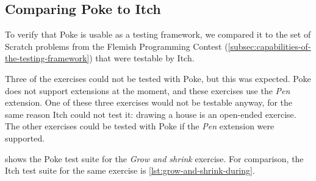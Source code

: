 \documentclass[../main]{subfiles}
\begin{document}
\subsection{Comparing Poke to Itch}\label{subsec:comparing-poke-to-itch}

To verify that Poke is usable as a testing framework, we compared it to the set of Scratch problems from the Flemish Programming Contest (\cref{subsec:capabilities-of-the-testing-framework}) that were testable by Itch.

Three of the exercises could not be tested with Poke, but this was expected.
Poke does not support extensions at the moment, and these exercises use the \textit{Pen} extension.
One of these three exercises would not be testable anyway, for the same reason Itch could not test it: drawing a house is an open-ended exercise.
The other exercises could be tested with Poke if the \textit{Pen} extension were supported.

 shows the Poke test suite for the \emph{Grow and shrink} exercise.
For comparison, the Itch test suite for the same exercise is \cref{lst:grow-and-shrink-during}.
\end{document}
